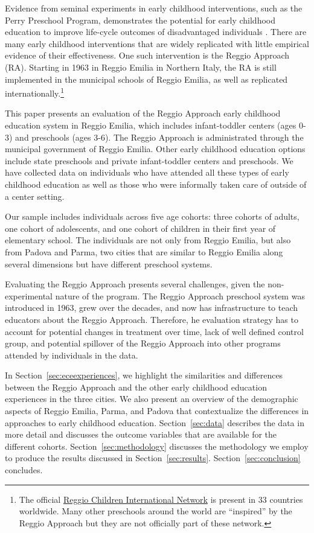 Evidence from seminal experiments in early childhood interventions, such as the Perry Preschool Program, demonstrates the potential for early childhood education to improve life-cycle outcomes of disadvantaged individuals \citep{Heckman_Moon_etal_2010_QE, Elango_Hojman_etal_2016_Early-Edu}. There are many early childhood interventions that are widely replicated with little empirical evidence of their effectiveness. One such intervention is the Reggio Approach (RA). Starting in 1963 in Reggio Emilia in Northern Italy, the RA is still implemented in the municipal schools of Reggio Emilia, as well as replicated internationally.\footnote{The official \href{http://www.reggiochildren.it/network/?lang=en}{Reggio Children International Network} is present in 33 countries worldwide. Many other preschools around the world are ``inspired'' by the Reggio Approach but they are not officially part of these network.}

This paper presents an evaluation of the Reggio Approach early childhood education system in Reggio Emilia, which includes infant-toddler centers (ages 0-3) and preschools (ages 3-6). The Reggio Approach is administrated through the municipal government of Reggio Emilia. Other early childhood education options include state preschools and private infant-toddler centers and preschools. We have collected data on individuals who have attended all these types of early childhood education as well as those who were informally taken care of outside of a center setting. 

Our sample includes individuals across five age cohorts: three cohorts of adults, one cohort of adolescents, and one cohort of children in their first year of elementary school. The individuals are not only from Reggio Emilia, but also from Padova and Parma, two cities that are similar to Reggio Emilia along several dimensions but have different preschool systems. 

Evaluating the Reggio Approach presents several challenges, given the non-experimental nature of the program. The Reggio Approach preschool system was introduced in 1963, grew over the decades, and now has infrastructure to teach educators about the Reggio Approach. Therefore, he evaluation strategy has to account for potential changes in treatment over time, lack of well defined control group, and potential spillover of the Reggio Approach into other programs attended by individuals in the data. 


In Section~\ref{sec:eceexperiences}, we highlight the similarities and differences between the Reggio Approach and the other early childhood education experiences in the three cities. We also present an overview of the demographic aspects of Reggio Emilia, Parma, and Padova that contextualize the differences in approaches to early childhood education. Section~\ref{sec:data} describes the data in more detail and discusses the outcome variables that are available for the different cohorts. Section~\ref{sec:methodology} discusses the methodology we employ to produce the results discussed in Section~\ref{sec:results}. Section~\ref{sec:conclusion} concludes.
